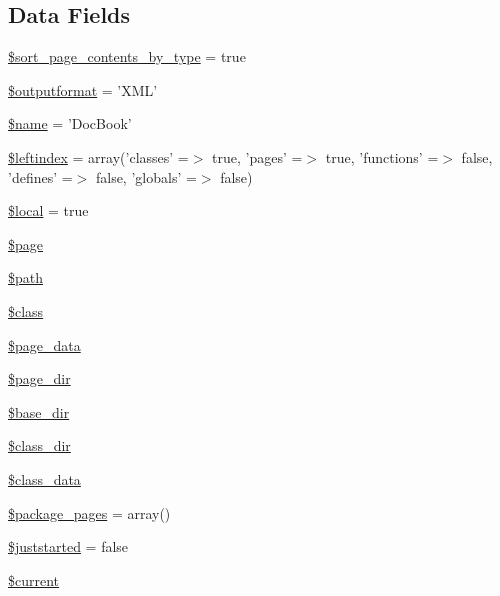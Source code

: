 \subsection*{\-Data \-Fields}
\begin{DoxyCompactItemize}
\item 
\hyperlink{class_x_m_l_doc_book_converter_ab5dae87e1968b35e37687a763216a835}{\$sort\-\_\-page\-\_\-contents\-\_\-by\-\_\-type} = true
\item 
\hyperlink{class_x_m_l_doc_book_converter_af0bfe153c049d957e8ea29b147025108}{\$outputformat} = '\-X\-M\-L'
\item 
\hyperlink{class_x_m_l_doc_book_converter_ab2fc40d43824ea3e1ce5d86dee0d763b}{\$name} = '\-Doc\-Book'
\item 
\hyperlink{class_x_m_l_doc_book_converter_ab49669c749559bb7833762878adb8f0c}{\$leftindex} = array('classes' =$>$ true, 'pages' =$>$ true, 'functions' =$>$ false, 'defines' =$>$ false, 'globals' =$>$ false)
\item 
\hyperlink{class_x_m_l_doc_book_converter_a6d3acd7bb365291cea0fc4b71fe5682a}{\$local} = true
\item 
\hyperlink{class_x_m_l_doc_book_converter_a0a44e6760141442bb439b1ab1395d8ff}{\$page}
\item 
\hyperlink{class_x_m_l_doc_book_converter_a0a4baf0b22973c07685c3981f0d17fc4}{\$path}
\item 
\hyperlink{class_x_m_l_doc_book_converter_a252ba022809910ea710a068fc1bab657}{\$class}
\item 
\hyperlink{class_x_m_l_doc_book_converter_a22fa57ada47299e1b00ca90f550a1194}{\$page\-\_\-data}
\item 
\hyperlink{class_x_m_l_doc_book_converter_ab554c658003c5e2653580ba881cd50eb}{\$page\-\_\-dir}
\item 
\hyperlink{class_x_m_l_doc_book_converter_aa36f57c62963507498e1181f9a75bbb9}{\$base\-\_\-dir}
\item 
\hyperlink{class_x_m_l_doc_book_converter_aaeaa82d379050faafbb4bf4b82733c94}{\$class\-\_\-dir}
\item 
\hyperlink{class_x_m_l_doc_book_converter_afdb3770ba45b6d4db2c00c8c18832482}{\$class\-\_\-data}
\item 
\hyperlink{class_x_m_l_doc_book_converter_acb916db0304b969918dbc0de762d45e0}{\$package\-\_\-pages} = array()
\item 
\hyperlink{class_x_m_l_doc_book_converter_acb00e2d25525278b0592bfffe53bc4b6}{\$juststarted} = false
\item 
\hyperlink{class_x_m_l_doc_book_converter_a2c4c58e377f6c66ca38c8ea97666fc5e}{\$current}

\end{DoxyCompactItemize}
